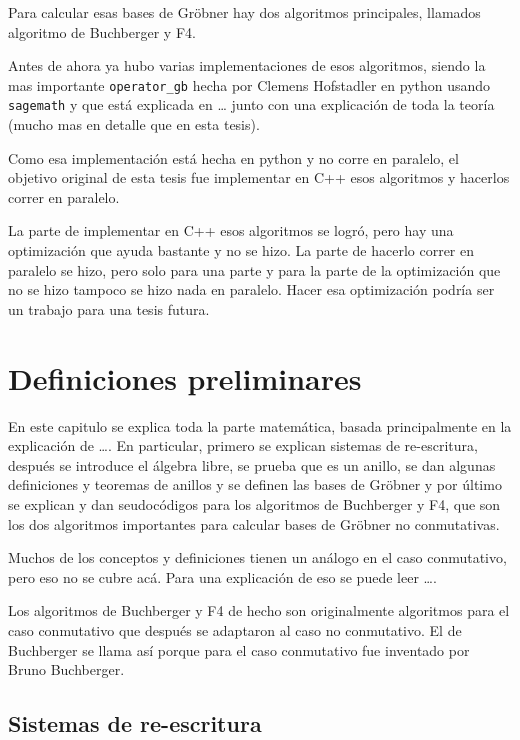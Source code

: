 \documentclass{report}
\theoremstyle{customstyle}
\theoremstyle{factstyle}
\begin{document}
Para calcular esas bases de Gröbner hay dos algoritmos principales, llamados algoritmo de Buchberger y F4.

Antes de ahora ya hubo varias implementaciones de esos algoritmos, siendo la mas importante \texttt{operator\_gb} hecha por Clemens Hofstadler en python usando \texttt{sagemath} y que está explicada en … %
junto con una explicación de toda la teoría (mucho mas en detalle que en esta tesis).

Como esa implementación está hecha en python y no corre en paralelo, el objetivo original de esta tesis fue implementar en C++ esos algoritmos y hacerlos correr en paralelo.

La parte de implementar en C++ esos algoritmos se logró, pero hay una optimización que ayuda bastante y no se hizo. La parte de hacerlo correr en paralelo se hizo, pero solo para una parte y para la parte de la optimización que no se hizo tampoco se hizo nada en paralelo. Hacer esa optimización podría ser un trabajo para una tesis futura.

\chapter{Definiciones preliminares}\label{cap:Definiciones preliminares}

En este capitulo se explica toda la parte matemática, basada principalmente en la explicación de …. %
En particular, primero se explican sistemas de re-escritura, después se introduce el álgebra libre, se prueba que es un anillo, se dan algunas definiciones y teoremas de anillos y se definen las bases de Gröbner y por último se explican y dan seudocódigos para los algoritmos de Buchberger y F4, que son los dos algoritmos importantes para calcular bases de Gröbner no conmutativas.

Muchos de los conceptos y definiciones tienen un análogo en el caso conmutativo, pero eso no se cubre acá. Para una explicación de eso se puede leer …. %

Los algoritmos de Buchberger y F4 de hecho son originalmente algoritmos para el caso conmutativo que después se adaptaron al caso no conmutativo. El de Buchberger se llama así porque para el caso conmutativo fue inventado por Bruno Buchberger.

\section{Sistemas de re-escritura}
\end{document}
